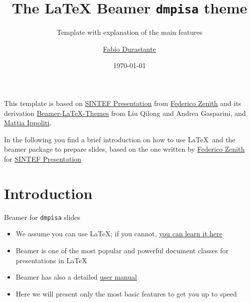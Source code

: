 \documentclass{beamer}
\title{The \texorpdfstring{\LaTeX}{LaTeX} Beamer \texorpdfstring{\texttt{dmpisa}}{dmpisa} theme}
\subtitle{Template with explanation of the main features}
\author{\href{mailto:fabio.durastante@unipi.it}{Fabio Durastante}}
\date{\today}
\newcommand{\hrefcol}[2]{\textcolor{cyan}{\href{#1}{#2}}}
\begin{document}
\maketitle

\begin{frame}

This template is based on \hrefcol{https://www.overleaf.com/latex/templates/sintef-presentation/jhbhdffczpnx}{SINTEF Presentation} from \hrefcol{mailto:federico.zenith@sintef.no}{Federico Zenith} and its derivation \hrefcol{https://github.com/TOB-KNPOB/Beamer-LaTeX-Themes}{Beamer-LaTeX-Themes} from Liu Qilong and Andrea Gasparini, and \hrefcol{https://github.com/MattiaIppoliti}{Mattia Ippoliti}. 

\vspace{\baselineskip}

In the following you find a brief introduction on how to use \LaTeX\ and the beamer package to prepare slides, based on the one written by \hrefcol{mailto:federico.zenith@sintef.no}{Federico Zenith} for \hrefcol{https://www.overleaf.com/latex/templates/sintef-presentation/jhbhdffczpnx}{SINTEF Presentation}

\end{frame}

\section{Introduction}

\begin{frame}{Beamer for \texttt{dmpisa} slides}
\begin{itemize}
\item We assume you can use \LaTeX; if you cannot,
\hrefcol{http://en.wikibooks.org/wiki/LaTeX/}{you can learn it here}
\item Beamer is one of the most popular and powerful document
classes for presentations in \LaTeX
\item Beamer has also a detailed
\hrefcol{http://www.ctan.org/tex-archive/macros/latex/contrib/beamer/doc/beameruserguide.pdf}{user
 manual}
\item Here we will present only the most basic features to get you up to speed
\end{itemize}
\end{frame}
\end{document}
